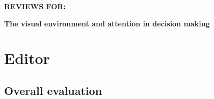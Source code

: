 
\singlespacing
\begin{center}

{\Large \textbf{REVIEWS FOR:}}

\vspace{1cm}

{\Large \textbf{The visual environment and attention in decision making}}

\vspace{5mm}


\vspace{1cm}
\end{center}



\section{Editor}
\label{rev:editor}

\subsection{Overall evaluation}

